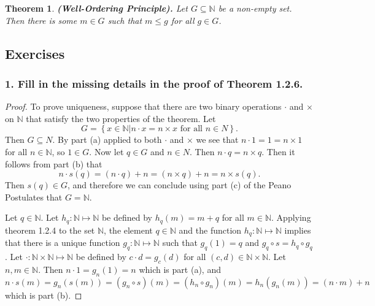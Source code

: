 \documentclass{article}
\newtheorem{theorem}{Theorem}
\newcommand{\N}{\mathbb{N}}
\begin{document}
\begin{theorem}
	\textbf{(Well-Ordering Principle).} Let $G \subseteq \N$ be a non-empty set. Then there is some $m \in G$ such that $m \le g$ for all $g \in G$.
\end{theorem}

\subsection*{Exercises}

\subsubsection*{1. Fill in the missing details in the proof of Theorem 1.2.6.}

\begin{proof}
	To prove uniqueness, suppose that there are two binary operations $\cdot$ and $\times$ on $\N$ that satisfy the two properties of the theorem. Let \[G = \left\{x \in \N | n \cdot x = n \times x \text{ for all } n \in N\right\}.\]
	Then $G \subseteq N$. By part (a) applied to both $\cdot$ and $\times$ we see that $n \cdot 1 = 1 = n \times 1$ for all $n \in \N$, so $1 \in G$. Now let $q \in G$ and $n \in N$. Then $n \cdot q = n \times q$. Then it follows from part (b) that \[n \cdot s(q) = (n \cdot q) + n = (n \times q) + n = n \times s(q).\] Then $s(q) \in G$, and therefore we can conclude using part (c) of the Peano Postulates that $G = \N$.

	Let $q \in \N$. Let $h_q: \N \mapsto \N$ be defined by $h_q(m) = m + q$ for all $m \in \N$. Applying theorem 1.2.4 to the set $\N$, the element $q \in \N$ and the function $h_q: \N \mapsto \N$ implies that there is a unique function $g_q: \N \mapsto \N$ such that $g_q(1) = q$ and $g_q \circ s = h_q \circ g_q$. Let $\cdot: \N \times \N \mapsto \N$ be defined by $c \cdot d = g_c(d)$ for all $(c,d)\in \N \times \N$. Let $n,m \in \N$. Then $n \cdot 1 = g_n(1) = n$ which is part (a), and $n \cdot s(m) = g_n(s(m)) = (g_n \circ s)(m) = (h_n \circ g_n)(m) = h_n(g_n(m)) = (n \cdot m) + n$ which is part (b).
\end{proof}
\end{document}

